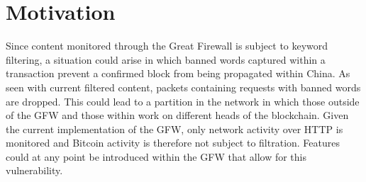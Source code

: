 \section{Motivation}
Since content monitored through the Great Firewall is subject to keyword filtering, a situation could arise in which banned words captured within a transaction prevent a confirmed block from being propagated within China. As seen with current filtered content, packets containing requests with banned words are dropped. This could lead to a partition in the network in which those outside of the GFW and those within work on different heads of the blockchain. Given the current implementation of the GFW, only network activity over HTTP is monitored and Bitcoin activity is therefore not subject to filtration. Features could at any point be introduced within the GFW that allow for this vulnerability. 